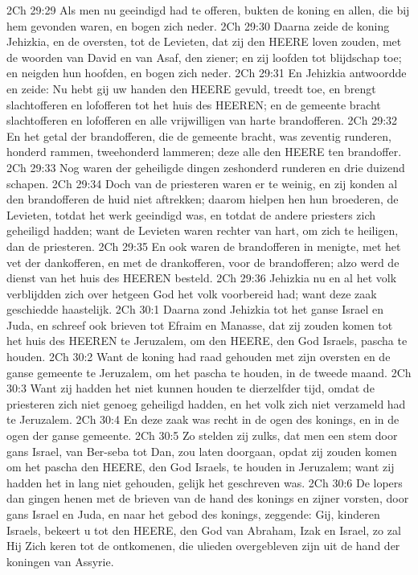 2Ch 29:29  Als men nu geeindigd had te offeren, bukten de koning en allen, die bij hem gevonden waren, en bogen zich neder.
2Ch 29:30  Daarna zeide de koning Jehizkia, en de oversten, tot de Levieten, dat zij den HEERE loven zouden, met de woorden van David en van Asaf, den ziener; en zij loofden tot blijdschap toe; en neigden hun hoofden, en bogen zich neder.
2Ch 29:31  En Jehizkia antwoordde en zeide: Nu hebt gij uw handen den HEERE gevuld, treedt toe, en brengt slachtofferen en lofofferen tot het huis des HEEREN; en de gemeente bracht slachtofferen en lofofferen en alle vrijwilligen van harte brandofferen.
2Ch 29:32  En het getal der brandofferen, die de gemeente bracht, was zeventig runderen, honderd rammen, tweehonderd lammeren; deze alle den HEERE ten brandoffer.
2Ch 29:33  Nog waren der geheiligde dingen zeshonderd runderen en drie duizend schapen.
2Ch 29:34  Doch van de priesteren waren er te weinig, en zij konden al den brandofferen de huid niet aftrekken; daarom hielpen hen hun broederen, de Levieten, totdat het werk geeindigd was, en totdat de andere priesters zich geheiligd hadden; want de Levieten waren rechter van hart, om zich te heiligen, dan de priesteren.
2Ch 29:35  En ook waren de brandofferen in menigte, met het vet der dankofferen, en met de drankofferen, voor de brandofferen; alzo werd de dienst van het huis des HEEREN besteld.
2Ch 29:36  Jehizkia nu en al het volk verblijdden zich over hetgeen God het volk voorbereid had; want deze zaak geschiedde haastelijk.
2Ch 30:1  Daarna zond Jehizkia tot het ganse Israel en Juda, en schreef ook brieven tot Efraim en Manasse, dat zij zouden komen tot het huis des HEEREN te Jeruzalem, om den HEERE, den God Israels, pascha te houden.
2Ch 30:2  Want de koning had raad gehouden met zijn oversten en de ganse gemeente te Jeruzalem, om het pascha te houden, in de tweede maand.
2Ch 30:3  Want zij hadden het niet kunnen houden te dierzelfder tijd, omdat de priesteren zich niet genoeg geheiligd hadden, en het volk zich niet verzameld had te Jeruzalem.
2Ch 30:4  En deze zaak was recht in de ogen des konings, en in de ogen der ganse gemeente.
2Ch 30:5  Zo stelden zij zulks, dat men een stem door gans Israel, van Ber-seba tot Dan, zou laten doorgaan, opdat zij zouden komen om het pascha den HEERE, den God Israels, te houden in Jeruzalem; want zij hadden het in lang niet gehouden, gelijk het geschreven was.
2Ch 30:6  De lopers dan gingen henen met de brieven van de hand des konings en zijner vorsten, door gans Israel en Juda, en naar het gebod des konings, zeggende: Gij, kinderen Israels, bekeert u tot den HEERE, den God van Abraham, Izak en Israel, zo zal Hij Zich keren tot de ontkomenen, die ulieden overgebleven zijn uit de hand der koningen van Assyrie.
